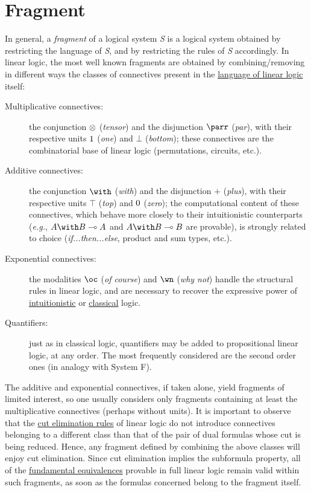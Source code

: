 \chapter{Fragment}\label{fragment}

In general, a \emph{fragment} of a logical system \emph{S} is a
logical system obtained by restricting the language of \emph{S}, and by
restricting the rules of \emph{S} accordingly. In linear logic, the most
well known fragments are obtained by combining/removing in different
ways the classes of connectives present in the
\hyperref[sequent-calculus]{language of linear logic} itself:
\begin{description}
\item[Multiplicative connectives:] the conjunction \(\otimes\)
  (\emph{tensor}) and the disjunction \(\parr\) (\emph{par}), with their
  respective units \(1\) (\emph{one}) and \(\bot\) (\emph{bottom});
  these connectives are the combinatorial base of linear logic
  (permutations, circuits, etc.).
\item[Additive connectives:] the conjunction \(\with\) (\emph{with})
  and the disjunction \(\plus\) (\emph{plus}), with their respective
  units \(\top\) (\emph{top}) and \(0\) (\emph{zero}); the
  computational content of these connectives, which behave more closely
  to their intuitionistic counterparts (\emph{e.g.}, \(A\with B\limp A\)
  and \(A\with B\limp B\) are provable), is strongly related to choice
  (\emph{if...then...else}, product and sum types, etc.).
\item[Exponential connectives:] the modalities \(\oc\) (\emph{of
  course}) and \(\wn\) (\emph{why not}) handle the structural rules in
  linear logic, and are necessary to recover the expressive power of
  \hyperref[translations-of-intuitionistic-logic]{intuitionistic} or \hyperref[translations-of-classical-logic]{classical} logic.
\item[Quantifiers:] just as in classical logic, quantifiers may be
  added to propositional linear logic, at any order. The most frequently
  considered are the second order ones (in analogy with System F).
\end{description}

The additive and exponential connectives, if taken alone, yield
fragments of limited interest, so one usually considers only fragments
containing at least the multiplicative connectives (perhaps without
units). It is important to observe that the
\hyperref[cut-elimination-and-consequences]{cut elimination rules} of linear logic do not introduce connectives
belonging to a different class than that of the pair of dual formulas
whose cut is being reduced. Hence, any fragment defined by combining the
above classes will enjoy cut elimination. Since cut elimination implies
the subformula property, all of the
\hyperref[equivalences]{fundamental equivalences} provable
in full linear logic remain valid within such fragments, as soon as the
formulas concerned belong to the fragment itself.

